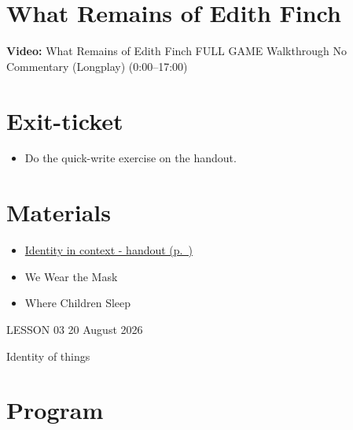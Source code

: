 \documentclass[11pt,a4paper,oneside]{book}
\begin{document}
\section*{What Remains of Edith Finch}

\par\noindent\textbf{Video:} What Remains of Edith Finch FULL GAME Walkthrough No Commentary (Longplay) (0:00–17:00)\par\medskip

\section*{Exit-ticket}

\begin{itemize}
\item Do the quick-write exercise on the handout.
\end{itemize}

\section*{Materials}

\begin{itemize}
\item \hyperref[worksheet-2]{Identity in context - handout (p.~\pageref*{worksheet-2})}
\item We Wear the Mask
\item Where Children Sleep
\end{itemize}

\clearpage{}
{\color{blue}\small LESSON 03 \hfill 20 August 2026\par}
\vspace{4mm}
{\displayfont\color{navy}\fontsize{30}{34}\selectfont Identity of things\par}\vspace{4mm}

\section*{Program}
\end{document}
